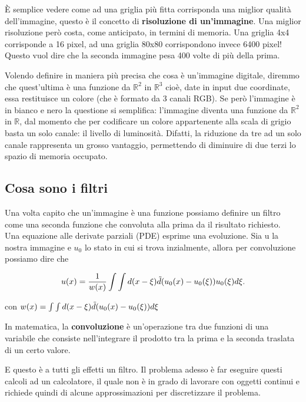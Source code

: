 \noindent
\`E semplice vedere come ad una griglia più fitta corrisponda una miglior qualità dell'immagine, questo è il concetto di \textbf{risoluzione di un'immagine}. 
Una miglior risoluzione però costa, come anticipato, in termini di memoria. Una griglia 4x4 corrisponde a 16 pixel, ad una griglia 80x80 corrispondono invece 6400 pixel! Questo vuol dire che la seconda immagine pesa 400 volte di più della prima.

\vspace{1em} \noindent
Volendo definire in maniera più precisa che cosa è un'immagine digitale, diremmo che quest'ultima è una funzione da $\mathbb R^2$ in $\mathbb R^3$ cioè, date in input due coordinate, essa restituisce un colore (che è formato da 3 canali RGB). Se però l'immagine è in bianco e nero la questione si semplifica: l'immagine diventa una funzione da $\mathbb R^2$ in $\mathbb R$, dal momento che per codificare un colore appartenente alla scala di grigio basta un solo canale: il livello di luminosità. Difatti, la riduzione da tre ad un solo canale rappresenta un grosso vantaggio, permettendo di diminuire di due terzi lo spazio di memoria occupato.

\subsection{Cosa sono i filtri}
Una volta capito che un'immagine è una funzione possiamo definire un filtro come una seconda funzione che convoluta alla prima da il risultato richiesto.\\
Una equazione alle derivate parziali (PDE) esprime una evoluzione. Sia u la nostra immagine e $u_0$ lo stato in cui si trova inzialmente, allora per convoluzione possiamo dire che 

\begin{equation} \label{eq:eq3}
u(x)=\frac{1}{w(x)}\int\int d(x-\xi)\Tilde{d}(u_0(x) -u_0(\xi))u_0(\xi)d\xi.
\end{equation}

\centering con  $w(x) = \int\int d(x-\xi)\Tilde{d}(u_0(x) -u_0(\xi))d\xi$ \cite{korn}\newline

\raggedright

In matematica, la \textbf{convoluzione} è un'operazione tra due funzioni di una variabile che consiste nell'integrare il prodotto tra la prima e la seconda traslata di un certo valore.

E questo è a tutti gli effetti un filtro. Il problema adesso è far eseguire questi calcoli ad un calcolatore, il quale non è in grado di lavorare con oggetti continui e richiede quindi di alcune approssimazioni per discretizzare il problema.

